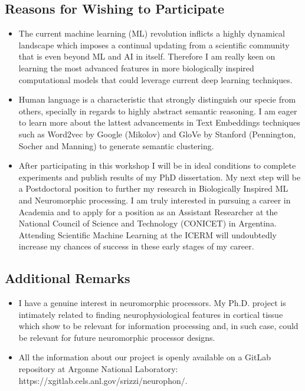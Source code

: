 \documentclass{article}
\begin{document}
\subsection*{Reasons for Wishing to Participate}
\begin{itemize}
	\item The current machine learning (ML) revolution inflicts a highly dynamical landscape which imposes a continual updating from a scientific community that is even beyond ML and AI in itself. Therefore I am really keen on learning the most advanced features in more biologically inspired computational models that could leverage current deep learning techniques.

	\item Human language is a characteristic that strongly distinguish our specie from others, specially in regards to highly abstract semantic reasoning. I am eager to learn more about the lattest advancements in Text Embeddings techniques such as Word2vec by Google (Mikolov) and GloVe by Stanford (Pennington, Socher and Manning) to generate semantic clustering.

	\item After participating in this workshop I will be in ideal conditions to complete experiments and publish results of my PhD dissertation. My next step will be a Postdoctoral position to further my research in Biologically Inspired ML and Neuromorphic processing. I am truly interested in pursuing a career in Academia and to apply for a position as an Assistant Researcher at the National Council of Science and Technology (CONICET) in Argentina. Attending Scientific Machine Learning at the ICERM will undoubtedly increase my chances of success in these early stages of my career.
\end{itemize}

\subsection*{Additional Remarks}
\begin{itemize}
	\item I have a genuine interest in neuromorphic processors. My Ph.D. project is intimately related to finding neurophysiological features in cortical tissue which show to be relevant for information processing and, in such case, could be relevant for future neuromorphic processor designs.

	\item All the information about our project is openly available on a GitLab repository at Argonne National Laboratory: https://xgitlab.cels.anl.gov/srizzi/neurophon/.
\end{itemize}
\end{document}
